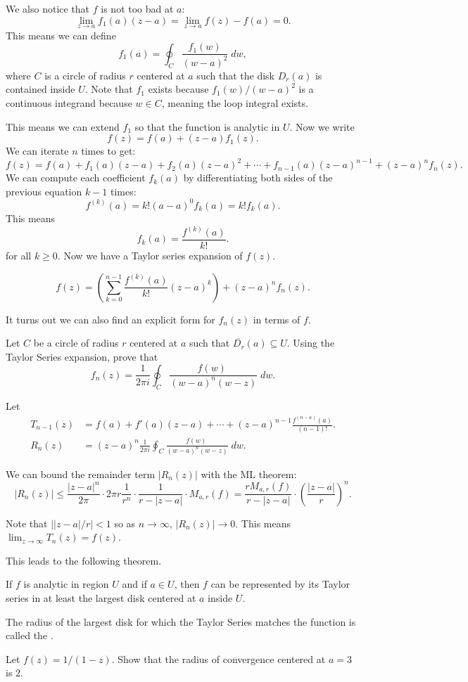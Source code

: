 \documentclass[notes]{subfile}
\begin{document}
We also notice that $f$ is not too bad at $a$:
\[ \lim_{z \to a} f_1(a) (z-a) = \lim_{z\to a} f(z) - f(a) = 0. \]
This means we can define 
\[ f_1(a) = \oint_C \frac{f_1(w)}{(w-a)^2} \; dw, \]
where $C$ is a circle of radius $r$ centered at $a$ such that the
disk $D_r(a)$ is contained inside $U$. 
Note that $f_1$ exists because $f_1(w)/(w-a)^2$ is a continuous
integrand because $w \in C$, meaning the loop integral exists.

This means we can extend $f_1$ so that the function is analytic
in $U$.
Now we write
\[ f(z) = f(a) + (z-a)f_1(z). \]
We can iterate $n$ times to get:
\[ f(z) = f(a) + f_1(a) (z-a) + f_2(a) (z-a)^2 + \cdots +
f_{n-1}(a)(z-a)^{n-1} + (z-a)^nf_n(z). \]
We can compute each coefficient $f_k(a)$ by differentiating both sides of the previous equation $k-1$ times:
\[f^{(k)}(a) = k!(a-a)^0f_k(a) = k!f_k(a). \]
This means
\[ f_k(a) = \frac{f^{(k)}(a)}{k!}.\]
for all $k \ge 0$.  Now we have a Taylor series expansion of $f(z)$.
\begin{theorem}
    \[ f(z) = \left( \sum_{k=0}^{n-1} \frac{f^{(k)}(a)}{k!} (z-a)^k \right) + (z-a)^nf_n(z). \]
\end{theorem}

\noindent
It turns out we can also find an explicit form for $f_n(z)$ in terms
of $f$.

\begin{exercise}
    Let $C$ be a circle of radius $r$ centered at $a$ such that
    $\overline{D_r}(a) \subseteq U$.
    Using the Taylor Series expansion, prove that
    \[ f_n(z) = \frac{1}{2\pi i} \oint_{C} \frac{f(w) \; }{(w-a)^n (w-z)}
    \; dw. \]
\end{exercise}

Let 
\begin{align*}
    T_{n-1}(z) &= f(a) + f'(a)(z-a) + \cdots + (z-a)^{n-1}
    \frac{f^{(n-a)}(a)}{(n-1)!}. \\
    R_n(z) &= (z-a)^n \frac{1}{2\pi i}\oint_C \frac{f(w) \; }{(w-a)^n (w-z)}
    \; dw.
\end{align*}

We can bound the remainder term $|R_n(z)|$ with the ML theorem:
\[ |R_n(z)| \le \frac{|z-a|^n}{2\pi}  
    \cdot 2\pi r \frac{1}{r^n} \cdot \frac{1}{r - |z-a|}
    \cdot M_{a,r}(f) = \frac{r M_{a,r}(f)}{r - |z-a|} \cdot 
\left( \frac{|z-a|}{r} \right)^n. \]

Note that $| |z-a|/r | < 1$ so as $n \to \infty$, $|R_n(z)| \to 0$.
This means $\lim_{z \to \infty} T_{n} (z) = f(z)$.

\noindent
This leads to the following theorem.
\begin{theorem}
    If $f$ is analytic in region $U$ and if $a \in U$, then $f$
    can be represented by its Taylor series in at least the largest
    disk centered at $a$ inside $U$.
\end{theorem}
The radius of the largest disk for which the Taylor Series 
matches the function is called the .

\begin{exercise}
    Let $f(z) = 1/(1-z)$.  Show that the radius 
    of convergence centered at $a=3$ is $2$.
\end{exercise}
\end{document}

